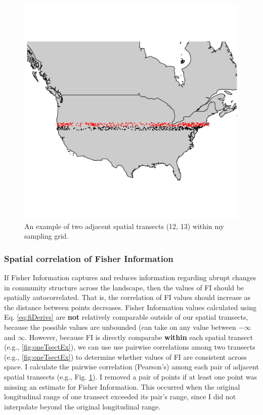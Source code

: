 \documentclass[12pt,twoside,openany]{reedthesis}
\begin{document}
\begin{figure}
\includegraphics[width=0.85\linewidth]{./chapterFiles/fisherSpatial/figures/figsCalledInDiss/transectSamplingEx_2rows} \caption{An example of two adjacent spatial transects (12, 13) within my sampling grid.}\label{fig:adjacentTsectEx}
\end{figure}
\subsubsection{Spatial correlation of Fisher
Information}\label{spatial-correlation-of-fisher-information}

If Fisher Information captures and reduces information regarding abrupt
changes in community structure across the landscape, then the values of
FI should be spatially autocorrelated. That is, the correlation of FI
values should increase as the distance between points decreases. Fisher
Information values calculated using Eq. \eqref{eq:fiDerivs} are
\textbf{not} relatively comparable outside of our spatial transects,
because the possible values are unbounded (can take on any value between
\(-\infty\) and \(\infty\). However, because FI is directly comparabe
\textbf{within} each spatial transect (e.g., \ref{fig:oneTsectEx}), we
can use use pairwise correlations among two transects (e.g.,
\ref{fig:oneTsectEx}) to determine whether values of FI are consistent
across space. I calculate the pairwise correlation (Pearson's) among
each pair of adjacent spatial transects (e.g., Fig.
\ref{fig:adjacentTsectEx}). I removed a pair of points if at least one
point was missing an estimate for Fisher Information. This occurred when
the original longitudinal range of one transect exceeded its pair's
range, since I did not interpolate beyond the original longitudinal
range.
\end{document}

